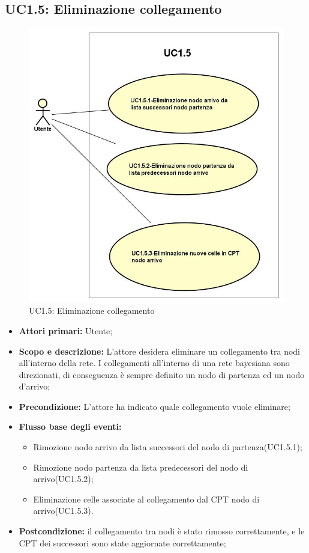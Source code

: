 \subsection{UC1.5: Eliminazione collegamento} 
\begin{figure} [H]
	\centering
	\includegraphics[scale=0.45]{Img/UC1-5} 
	\caption{UC1.5: Eliminazione collegamento} \label{} 
\end{figure} 
\begin{itemize} 
	\item{\textbf{Attori primari:} Utente;} 
	\item{\textbf{Scopo e descrizione:} L'attore desidera eliminare un collegamento tra nodi all'interno della rete. I collegamenti all'interno di una rete bayesiana sono direzionati, di conseguenza è sempre definito un nodo di partenza ed un nodo d'arrivo;} 
	\item{\textbf{Precondizione:} L'attore ha indicato quale collegamento vuole eliminare;} 
	\item{\textbf{Flusso base degli eventi:} } 
		\begin{itemize} 
			\item{Rimozione nodo arrivo da lista successori del nodo di partenza(UC1.5.1);} 
			\item{Rimozione nodo partenza da lista predecessori del nodo di arrivo(UC1.5.2);} 
			\item{Eliminazione celle associate al collegamento dal CPT nodo di arrivo(UC1.5.3).} 
		\end{itemize} 
	\item{\textbf{Postcondizione:} il collegamento tra nodi è stato rimosso correttamente, e le CPT dei successori sono state aggiornate correttamente;} 
\end{itemize} 
